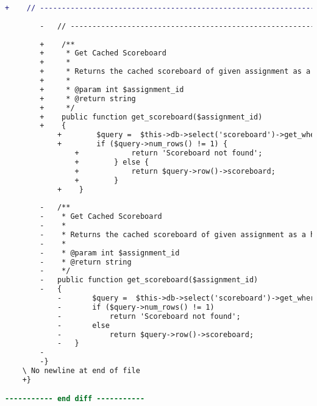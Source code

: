 \begin{lstlisting}[language=diff, caption=Perubahan pada kode Scoreboard\_model.php]
		+    // ------------------------------------------------------------------------
		
		-	// ------------------------------------------------------------------------
		
		+    /**
		+     * Get Cached Scoreboard
		+     *
		+     * Returns the cached scoreboard of given assignment as a html text
		+     *
		+     * @param int $assignment_id
		+     * @return string
		+     */
		+    public function get_scoreboard($assignment_id)
		+    {
			+        $query =  $this->db->select('scoreboard')->get_where('scoreboard', array('assignment' => $assignment_id));
			+        if ($query->num_rows() != 1) {
				+            return 'Scoreboard not found';
				+        } else {
				+            return $query->row()->scoreboard;
				+        }
			+    }
		
		-	/**
		-	 * Get Cached Scoreboard
		-	 *
		-	 * Returns the cached scoreboard of given assignment as a html text
		-	 *
		-	 * @param int $assignment_id
		-	 * @return string
		-	 */
		-	public function get_scoreboard($assignment_id)
		-	{
			-		$query =  $this->db->select('scoreboard')->get_where('scoreboard', array('assignment'=>$assignment_id));
			-		if ($query->num_rows() != 1)
			-			return 'Scoreboard not found';
			-		else
			-			return $query->row()->scoreboard;
			-	}
		-
		-}
	\ No newline at end of file
	+}

----------- end diff -----------
\end{lstlisting}

